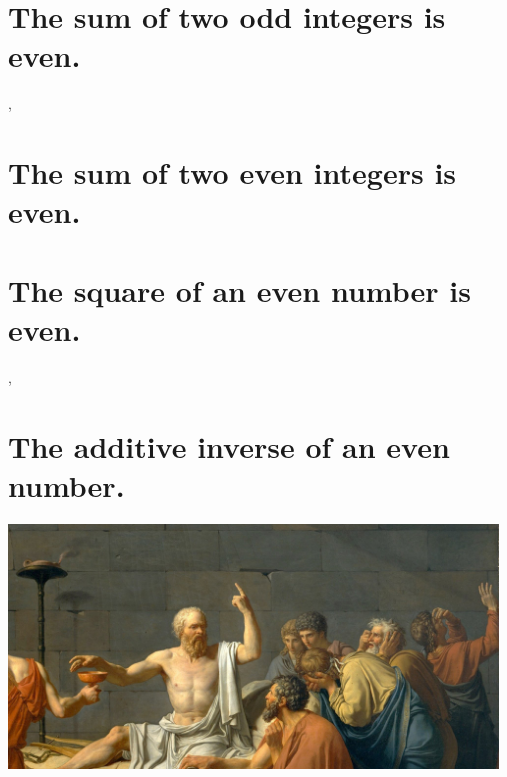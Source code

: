 \documentclass[preview]{standalone}
\begin{document}
\section{The sum of two odd integers is even.}

\sep


\section{The sum of two even integers is even.}

\pagebreak


\section{The square of an even number is even.}

\sep


\section{The additive inverse of an even number.}

\begin{center}
    \vspace{2\baselineskip}
    \includegraphics[width=13cm]{../resources/jpg/1.6.introduction.to.proofs/socrates.jpg}
\end{center}
\pagebreak


\end{document}
